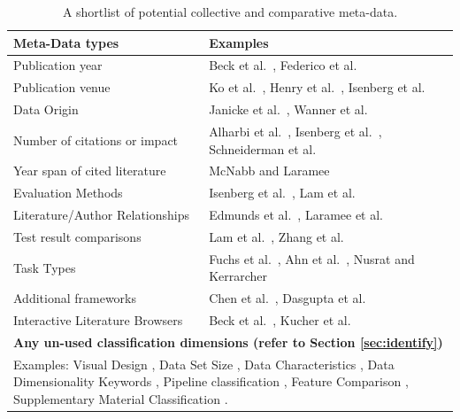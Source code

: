 \begin{table}[t]
\footnotesize
\centering
{}
\begin{tabularx}{1\textwidth}{|X|X|}
\hline \rowcolor{black!30}
Meta-Data types & Examples \\ \hline
Publication year & Beck et al.\ \cite{beck2014state}, Federico et al.\ \cite{federico2016survey} \\
Publication venue & Ko et al.\ \cite{ko2016survey}, Henry et al.\ \cite{henry200720}, Isenberg et al.\ \cite{isenberg2017VPD}\\
Data Origin & Janicke et al.\ \cite{janicke2016visual}, Wanner et al.\ \cite{wanner2014state} \\
Number of citations or impact & Alharbi et al.\ \cite{alharbi2018sos}, Isenberg et al.\ \cite{isenberg2017VPD}, Schneiderman et al.\ \cite{schneiderman2012innovation} \\
Year span of cited literature & McNabb and Laramee \cite{mcnabb2017sos}\\
Evaluation Methods & Isenberg et al.\ \cite{isenberg2013systematic}, Lam et al.\ \cite{lam2012empirical} \\
Literature/Author Relationships & Edmunds et al.\ \cite{edmunds2012surface}, Laramee et al.\ \cite{laramee2004state} \\
Test result comparisons & Lam et al.\ \cite{lam2012empirical}, Zhang et al.\ \cite{zhang2012visual}\\ 
Task Types & Fuchs et al.\ \cite{fuchs2016systematic}, Ahn et al.\ \cite{ahn2014task}, Nusrat and Kerrarcher \cite{nusrat2015task} \\
Additional frameworks & Chen et al.\ \cite{chen2015survey}, Dasgupta et al.\ \cite{dasgupta2012conceptualizing}\\
Interactive Literature Browsers & Beck et al.\ \cite{beck2016visual}, Kucher et al.\ \cite{kucher2015text}\\
\hline
\multicolumn{2}{|m{15.2cm}|}{\centering \textbf{Any un-used classification dimensions (refer to Section \ref{sec:identify})}}\\ \hline
\multicolumn{2}{|m{15.2cm}|}{\small Examples: Visual Design \cite{tong2018storytelling}, Data Set Size , Data Characteristics \cite{janicke2016visual, wanner2014state}, Data Dimensionality  \cite{isenberg2013systematic, fuchs2016systematic} Keywords \cite{isenberg2017visualization}, Pipeline classification \cite{liu2017visualizing}, Feature Comparison \cite{brezovsky2013software}, Supplementary Material Classification \cite{chavent2011gpu, gehlenborg2010visualization, secrier2013visualizing}.}\\


\hline
\end{tabularx}
\caption{A shortlist of potential collective and comparative meta-data.} \label{table:metaTable}
\end{table}
